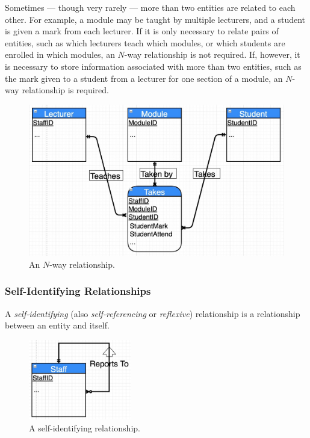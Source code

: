 Sometimes --- though very rarely --- more than two entities are related to each other.
For example, a module may be taught by multiple lecturers, and a student is given a mark from each lecturer.
If it is only necessary to relate pairs of entities, such as which lecturers teach which modules, or which students are enrolled in which modules, an \( N \)-way relationship is not required.
If, however, it is necessary to store information associated with more than two entities, such as the mark given to a student from a lecturer for one section of a module, an \( N \)-way relationship is required.

\begin{figure}[htp]
  \centering
  \includegraphics[width=\textwidth]{unit-1/figures/n-way-relationship.jpg}
  \caption*{An \( N \)-way relationship.}
\end{figure}

\subsubsection{Self-Identifying Relationships}

A \emph{self-identifying} (also \emph{self-referencing} or \emph{reflexive}) relationship is a relationship between an entity and itself.

\begin{figure}[htp]
  \centering
  \includegraphics[width=0.4\textwidth]{unit-1/figures/self-identifying-relationship.jpg}
  \caption*{A self-identifying relationship.}
\end{figure}

